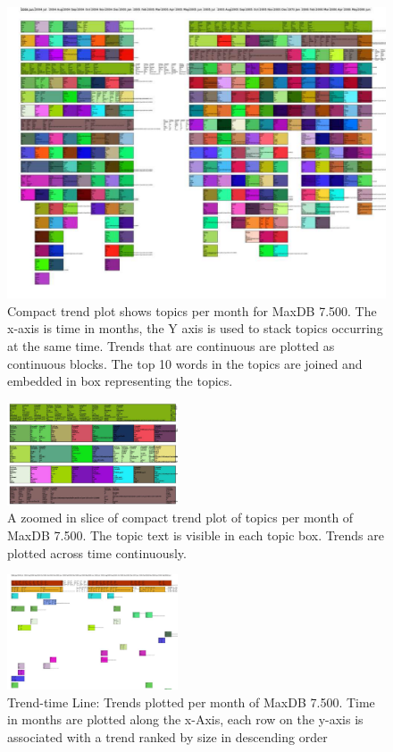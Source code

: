 \documentclass[times, 10pt,twocolumn]{article}
\begin{document}
\begin{figure}
  \centering
  \includegraphics[width=1.0\textwidth]{fixed-time-smear-plot-scaled}
  \caption{Compact trend plot shows topics per month for MaxDB
    7.500. The x-axis is time in months, the Y axis is used to stack
    topics occurring at the same time. Trends that are continuous are
    plotted as continuous blocks. The top 10 words in the topics are
    joined and embedded in box representing the topics.}
  \label{fig:topicsmear}
\end{figure}


\begin{figure}
  \centering
  \includegraphics[width=0.45\textwidth]{fixed-time-smear-plot-cropped}
  \caption{A zoomed in slice of compact trend plot of topics per month of MaxDB 7.500. The topic text is visible in each topic box. Trends are plotted across time continuously.}
  \label{fig:zoomedsmear}
\end{figure}


\begin{figure}
  \centering
  \includegraphics[width=0.45\textwidth]{class-smear-plot-crop-scaled}
  \caption{Trend-time Line: Trends plotted per month of MaxDB 7.500. Time in months are plotted along the x-Axis, each row on the y-axis is associated with a trend ranked by size in descending order}         
  \label{fig:trendtimeline}
\end{figure}
\end{document}
